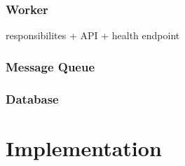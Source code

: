 \subsubsection{Worker}

responsibilites + API + health endpoint

\subsubsection{Message Queue}

\subsubsection{Database}

\section{Implementation}

